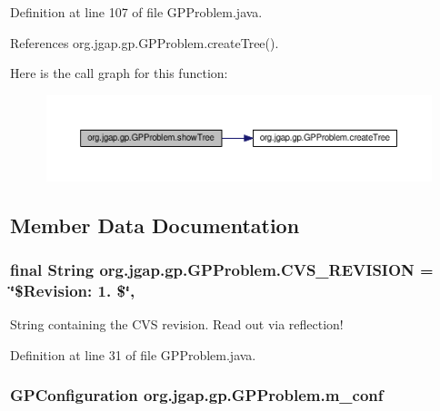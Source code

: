 Definition at line 107 of file G\-P\-Problem.\-java.



References org.\-jgap.\-gp.\-G\-P\-Problem.\-create\-Tree().



Here is the call graph for this function\-:
\nopagebreak
\begin{figure}[H]
\begin{center}
\leavevmode
\includegraphics[width=350pt]{classorg_1_1jgap_1_1gp_1_1_g_p_problem_a27d318e39fde759fbf39599da214baef_cgraph}
\end{center}
\end{figure}




\subsection{Member Data Documentation}
\hypertarget{classorg_1_1jgap_1_1gp_1_1_g_p_problem_abe59c6d8ca577968fa9d91ff38f76051}{
\subsubsection[{C\-V\-S\-\_\-\-R\-E\-V\-I\-S\-I\-O\-N}]{\setlength{\rightskip}{0pt plus 5cm}final String org.\-jgap.\-gp.\-G\-P\-Problem.\-C\-V\-S\-\_\-\-R\-E\-V\-I\-S\-I\-O\-N = \char`\"{}\$Revision\-: 1. \$\char`\"{}\hspace{0.3cm}{\ttfamily [static]}, {\ttfamily [private]}}}\label{classorg_1_1jgap_1_1gp_1_1_g_p_problem_abe59c6d8ca577968fa9d91ff38f76051}
String containing the C\-V\-S revision. Read out via reflection! 

Definition at line 31 of file G\-P\-Problem.\-java.

\hypertarget{classorg_1_1jgap_1_1gp_1_1_g_p_problem_a0df8d9ba3d4ec6007c8088887e02e361}{
\subsubsection[{m\-\_\-conf}]{\setlength{\rightskip}{0pt plus 5cm}G\-P\-Configuration org.\-jgap.\-gp.\-G\-P\-Problem.\-m\-\_\-conf\hspace{0.3cm}{\ttfamily [private]}}}\label{classorg_1_1jgap_1_1gp_1_1_g_p_problem_a0df8d9ba3d4ec6007c8088887e02e361}


